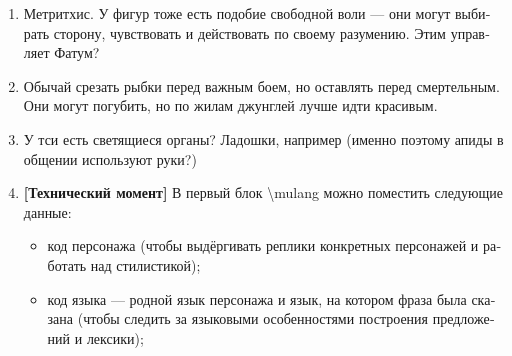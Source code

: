 \documentclass[a4paper,12pt,fleqn]{book}\usepackage{polyglossia}\setdefaultlanguage[babelshorthands=true]{russian}\setotherlanguage{english}\defaultfontfeatures{Ligatures=TeX,Mapping=tex-text}\usepackage{xcolor}\newcommand{\ml}[3]{#2}
\begin{document}
{\begin{enumerate}
Хри-соблазнитель.
Покровитель влюблённых, секса, игр и наркоманов.
Атрибут --- пухлые чувственные губы.

Кхар-защитник.
Покровитель защитников, отвечает за стены, ворота и доспехи.
Атрибут --- щит со стрелами.
Кхар-защитник обычно изображается настороженным, но не гневным.
Гневное изображение Кхара-защитника часто встречается в Пыльном Предгорье, иногда Кхар даже рисуется с полностью открытыми глазами (<<Яростный Кхар>>), но такие изображения считаются неканоничными.

Удивлённый Лю.
Отвечает за библиотеки и смотровые башни.
Покровитель учёных, исследователей и разведчиков.
Атрибут --- свиток.
Лю существует в двух вариантах: Удивлённый и Испуганный.
Удивлённый Лю рисуется на дверях библиотек, на тотемах и духовых ружьях.
Испуганный Лю используется в двух ситуациях --- предупреждение об опасности либо мольба об удачном побеге от врага.
Оба варианта признаются каноничными.

Печальный Митр, Митр-певец.
Покровитель отчаявшихся, менестрелей, поэтов и душевнобольных.
Атрибут --- перья для письма и чернильница.

Сан-сновидец.
Отвечает за сон, смерть и душевный покой.
Покровитель врачей и спящих.
Атрибут --- закрытый рот.

Обнимающий Сит.
Прообраз --- Ситхэ ар'Со, некрасивая, слабая и бесплодная женщина, которая ночами во время войн утешала чужих детей.
Покровитель детей, стариков и одиноких людей.
Атрибут --- руки.

\item Метритхис.
У фигур тоже есть подобие свободной воли --- они могут выбирать сторону, чувствовать и действовать по своему разумению.
Этим управляет Фатум?

\item Обычай срезать рыбки перед важным боем, но оставлять перед смертельным.
Они могут погубить, но по жилам джунглей лучше идти красивым.

\item У тси есть светящиеся органы?
Ладошки, например (именно поэтому апиды в общении используют руки?)

\item \textbf{[Технический момент]} В первый блок \textbackslash mulang можно поместить следующие данные:

\begin{itemize}
\item код персонажа (чтобы выдёргивать реплики конкретных персонажей и работать над стилистикой);
\item код языка --- родной язык персонажа и язык, на котором фраза была сказана (чтобы следить за языковыми особенностями построения предложений и лексики);
\end{itemize}


\end{enumerate}}
\end{document}

